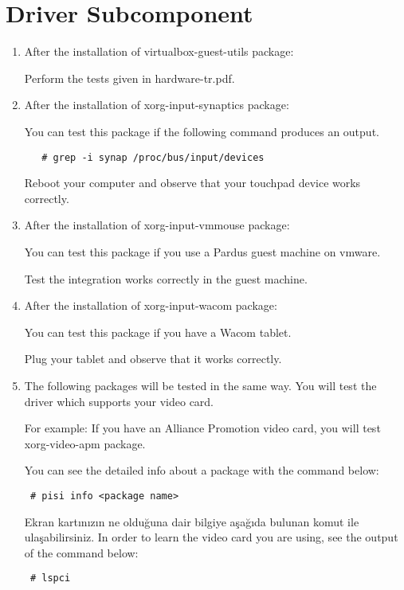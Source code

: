 \documentclass[a4paper,10pt]{article}
\begin{document}
\section{Driver Subcomponent}
\begin{enumerate}
  \item After the installation of virtualbox-guest-utils package:

Perform the tests given in hardware-tr.pdf.

  \item After the installation of xorg-input-synaptics package:

You can test this package if the following command produces an output.
  \begin{verbatim}
   # grep -i synap /proc/bus/input/devices
  \end{verbatim}

Reboot your computer and observe that your touchpad device works correctly.

\item After the installation of xorg-input-vmmouse package:

You can test this package if you use a Pardus guest machine on vmware.

Test the integration works correctly in the guest machine.

\item After the installation of xorg-input-wacom package:

You can test this package if you have a Wacom tablet.

Plug your tablet and observe that it works correctly.

\item The following packages will be tested in the same way. You will test the driver which supports your video card.

For example: If you have an Alliance Promotion video card, you will test xorg-video-apm package.

You can see the detailed info about a package with the command below:
\begin{verbatim}
 # pisi info <package name>
\end{verbatim}

Ekran kartınızın ne olduğuna dair bilgiye aşağıda bulunan komut ile ulaşabilirsiniz.
In order to learn the video card you are using, see the output of the command below:
\begin{verbatim}
 # lspci
\end{verbatim}


\end{enumerate}
\end{document}
